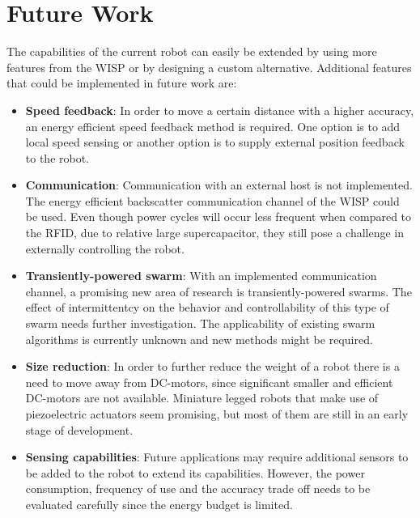 \section{Future Work}
\label{sec:limitations_future_work}

The capabilities of the current robot can easily be extended by using more features from the WISP or by designing a custom alternative.
Additional features that could be implemented in future work are:

\begin{itemize}

\item \textbf{Speed feedback}: 
In order to move a certain distance with a higher accuracy, an energy efficient speed feedback method is required.
One option is to add local speed sensing or another option is to supply external position feedback to the robot.


\item \textbf{Communication}: 
Communication with an external host is not implemented.
The energy efficient backscatter communication channel of the WISP could be used.
Even though power cycles will occur less frequent when compared to the RFID, due to relative large supercapacitor, they still pose a challenge in externally controlling the robot.

\item \textbf{Transiently-powered swarm}: 
With an implemented communication channel, a promising new area of research is transiently-powered swarms.
The effect of intermittentcy on the behavior and controllability of this type of swarm needs further investigation.
The applicability of existing swarm algorithms is currently unknown and new methods might be required.	

\item \textbf{Size reduction}: 
In order to further reduce the weight of a robot there is a need to move away from DC-motors, since significant smaller and efficient DC-motors are not available.
Miniature legged robots that make use of piezoelectric actuators seem promising, but most of them are still in an early stage of development.

\item \textbf{Sensing capabilities}: 
Future applications may require additional sensors to be added to the robot to extend its capabilities.
However, the power consumption, frequency of use and the accuracy trade off needs to be evaluated carefully since the energy budget is limited.


\end{itemize}

